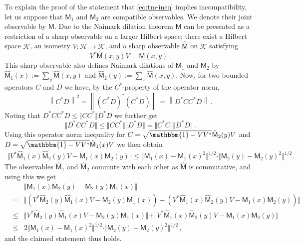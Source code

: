 \documentclass[12pt]{article}
\theoremstyle{definition}
\newcommand{\hi}{\mathcal{H}} %
\newcommand{\hik}{\mathcal{K}} %
\newcommand{\no}[1]{\left\|#1\right\|} %
\newcommand{\id}{\mathbbm{1}} %
\newcommand{\Mo}{\mathsf{M}}%
\begin{document}
To explain the proof of the statement that \eqref{eq:tm-ineq} implies 
incompatibility, let us suppose that $\Mo_1$ and $\Mo_2$ are compatible 
observables. We denote their joint observable by $\Mo$. Due to the Naimark 
dilation theorem $\Mo$ can be presented as a restriction of a sharp 
observable on a larger Hilbert space; there exist a Hilbert space $\hik$, an isometry 
$V: \hi \to \hik$, and a sharp observable $\hat{\Mo}$ 
on $\hik$ satisfying 
\begin{equation}
V^*\hat{\Mo}(x,y)V = \Mo(x,y) \, .
\end{equation}
This sharp observable also defines Naimark dilations of $\Mo_1$ and $\Mo_2$ 
by $\hat{\Mo}_1(x):= \sum_y \hat{\Mo}(x,y)$ and $\hat{\Mo}_2(y) := \sum_x \hat{\Mo}(x,y)$.
Now, for two bounded operators $C$ and $D$ we have, by the $C^*$-property of the operator norm, 
\begin{equation}
\no{C^* D}^2 = \no{(C^*D)^*(C^*D)} = \no{D^*CC^*D} \, .
\end{equation}
Noting that $D^*C C^*D \leq \Vert C C^*\Vert D^* D$
we further get
\begin{equation} 
\Vert D^*C C^*D\Vert \leq 
\Vert CC^*\Vert \Vert D^*D\Vert 
= \Vert C^* C\Vert \Vert D^*D\Vert \, . 
\end{equation}
Using this operator norm inequality  
for $C= \sqrt{\id - VV^*} \hat{\Mo}_2(y) V$ and 
$D= \sqrt{\id - VV^*} \hat{\Mo}_1(x) V$ we then obtain 
\begin{align}
\Vert V^* \hat{\Mo}_1(x) \hat{\Mo}_2(y) V - \Mo_1(x)\Mo_2(y) \Vert 
\leq \Vert \Mo_1(x)  - \Mo_1(x)^2 \Vert^{1/2} 
\cdot \Vert \Mo_2(y) - \Mo_2(y)^2 \Vert^{1/2}.  
\end{align}
The observables $\hat{\Mo}_1$ and $\hat{\Mo}_2$ commute with each other as $\hat{\Mo}$ is commutative, and using this we get
\begin{eqnarray*}
&&
\Vert \Mo_1(x) \Mo_2(y) - \Mo_2(y) \Mo_1(x) \Vert 
\\
&=& \Vert
 (V^* \hat{\Mo}_2(y) \hat{\Mo}_1(x) V - \Mo_2(y)\Mo_1(x))  
-(V^* \hat{\Mo}_1(x) \hat{\Mo}_2(y) V - \Mo_1(x)\Mo_2(y)) \Vert 
\\
&\leq & 
\Vert
 V^* \hat{\Mo}_2(y) \hat{\Mo}_1(x) V - \Mo_2(y)\Mo_1(x) 
\Vert 
+ \Vert 
V^* \hat{\Mo}_1(x) \hat{\Mo}_2(y) V - \Mo_1(x)\Mo_2(y) \Vert 
\\
&\leq &
2 
\Vert \Mo_1(x)  - \Mo_1(x)^2 \Vert^{1/2} 
\cdot \Vert \Mo_2(y) - \Mo_2(y)^2 \Vert^{1/2} \, , 
\label{eq:tm-ineq-2}  
\end{eqnarray*}
and the claimed statement thus holds. 
\end{document}
